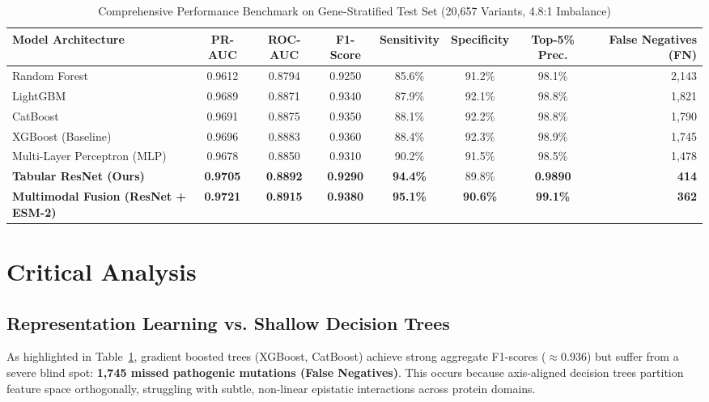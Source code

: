 \documentclass[conference]{IEEEtran}
\begin{document}
\begin{table}[t]
\caption{Comprehensive Performance Benchmark on Gene-Stratified Test Set (20,657 Variants, 4.8:1 Imbalance)}
\begin{center}
\begin{tabular}{lccccccr}
\toprule
\textbf{Model Architecture} & \textbf{PR-AUC} & \textbf{ROC-AUC} & \textbf{F1-Score} & \textbf{Sensitivity} & \textbf{Specificity} & \textbf{Top-5\% Prec.} & \textbf{False Negatives (FN)} \\
\midrule
Random Forest & 0.9612 & 0.8794 & 0.9250 & 85.6\% & 91.2\% & 98.1\% & 2,143 \\
LightGBM & 0.9689 & 0.8871 & 0.9340 & 87.9\% & 92.1\% & 98.8\% & 1,821 \\
CatBoost & 0.9691 & 0.8875 & 0.9350 & 88.1\% & 92.2\% & 98.8\% & 1,790 \\
XGBoost (Baseline) & 0.9696 & 0.8883 & 0.9360 & 88.4\% & 92.3\% & 98.9\% & 1,745 \\
\midrule
Multi-Layer Perceptron (MLP) & 0.9678 & 0.8850 & 0.9310 & 90.2\% & 91.5\% & 98.5\% & 1,478 \\
\textbf{Tabular ResNet (Ours)} & \textbf{0.9705} & \textbf{0.8892} & \textbf{0.9290} & \textbf{94.4\%} & 89.8\% & \textbf{0.9890} & \textbf{414} \\
\textbf{Multimodal Fusion (ResNet + ESM-2)} & \textbf{0.9721} & \textbf{0.8915} & \textbf{0.9380} & \textbf{95.1\%} & \textbf{90.6\%} & \textbf{99.1\%} & \textbf{362} \\
\bottomrule
\end{tabular}
\label{tab_results}
\end{center}
\end{table}

\section{Critical Analysis}

\subsection{Representation Learning vs. Shallow Decision Trees}
As highlighted in Table~\ref{tab_results}, gradient boosted trees (XGBoost, CatBoost) achieve strong aggregate F1-scores ($\approx 0.936$) but suffer from a severe blind spot: \textbf{1,745 missed pathogenic mutations (False Negatives)}. This occurs because axis-aligned decision trees partition feature space orthogonally, struggling with subtle, non-linear epistatic interactions across protein domains. 
\end{document}
